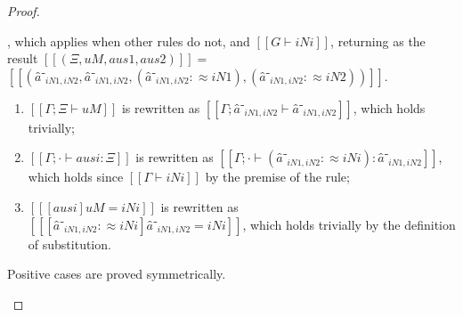 \begin{proof}
\begin{caseof}
        \item {}, which applies 
        when other rules do not, and $[[G ⊢ iNi]]$,
        returning as the result $[[(Ξ, uM, aus1, aus2)]] = $
        $[[(â⁻_{iN1, iN2}, â⁻_{iN1, iN2}, (â⁻_{iN1, iN2} :≈ iN1) ,  (â⁻_{iN1, iN2} :≈ iN2))]]$.

        \begin{enumerate}
            \item $[[Γ ; Ξ ⊢ uM]]$ is rewritten as $[[Γ ; â⁻_{iN1, iN2} ⊢ â⁻_{iN1, iN2}]]$,
                which holds trivially;
            \item $[[Γ ; · ⊢ ausi : Ξ]]$ is rewritten as $[[Γ ; · ⊢ (â⁻_{iN1, iN2} :≈ iNi) : â⁻_{iN1, iN2}]]$,
                which holds since $[[Γ ⊢ iNi]]$ by the premise of the rule;
            \item $[[ [ausi] uM = iNi ]]$ is rewritten as $[[ [â⁻_{iN1, iN2} :≈ iNi] â⁻_{iN1, iN2} = iNi ]]$,
                which holds trivially by the definition of substitution.
        \end{enumerate}

        \item Positive cases are proved symmetrically.
    \end{caseof}
\end{proof}

